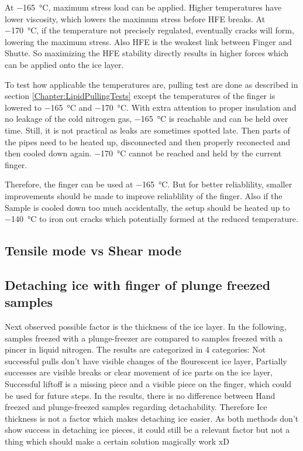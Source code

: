 At \SI{-165}{\degreeCelsius}, maximum stress load can be applied. Higher temperatures have lower viscosity, which lowers the maximum stress before HFE breaks. At \SI{-170}{\degreeCelsius}, if the temperature not precisely regulated, eventually cracks will form, lowering the maximum stress. Also HFE is the weakest link between Finger and Shutte. So maximizing the HFE stability directly results in higher forces which can be applied onto the ice layer.

To test how applicable the temperatures are, pulling test are done as described in section \ref{Chapter:LipidPullingTests} except the temperatures of the finger is lowered to \SI{-165}{\degreeCelsius} and \SI{-170}{\degreeCelsius}. With extra attention to proper insulation and no leakage of the cold nitrogen gas, \SI{-165}{\degreeCelsius} is reachable and can be held over time. Still, it is not practical as leaks are sometimes spotted late. Then parts of the pipes need to be heated up, disconnected and then properly reconected and then cooled down again. \SI{-170}{\degreeCelsius} cannot be reached and held by the current finger. 

Therefore, the finger can be used at \SI{-165}{\degreeCelsius}. But for better reliablility, smaller improvements should be made to improve reliablility of the finger. Also if the Sample is cooled down too much accidentally, the setup should be heated up to \SI{-140}{\degreeCelsius} to iron out cracks which potentially formed at the reduced temperature.

\subsection{Tensile mode vs Shear mode}



\subsection{Detaching ice with finger of plunge freezed samples}

Next observed possible factor is the thickness of the ice layer. In the following, samples freezed with a plunge-freezer are compared to samples freezed with a pincer in liquid nitrogen. The results are categorized in 4 categories: Not successful pulls don't have visible changes of the flourescent ice layer, Partially successes are visible breaks or clear movement of ice parts on the ice layer, Successful liftoff is a missing piece and a visible piece on the finger, which could be used for future steps. In the results, there is no difference between Hand freezed and plunge-freezed samples regarding detachability. Therefore Ice thickness is not a factor which makes detaching ice easier. As both methods don't show success in detaching ice pieces, it could still be a relevant factor but not a thing which should make a certain solution magically work xD


